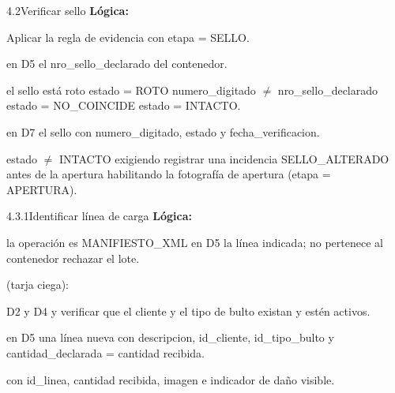 \begin{minispec}{4.2}{Verificar sello}
\textbf{Lógica:}
\begin{logica}
    \item Aplicar la regla de evidencia con etapa = SELLO.
    \item {} en D5 el nro\_sello\_declarado del contenedor.
    \item {} el sello está roto  estado = ROTO  numero\_digitado
    $\neq$ nro\_sello\_declarado  estado = NO\_COINCIDE  estado =
    INTACTO.
    \item {} en D7 el sello con numero\_digitado, estado y fecha\_verificacion.
    \item {} estado $\neq$ INTACTO  
    exigiendo registrar una incidencia SELLO\_ALTERADO antes de la apertura 
     habilitando la fotografía de apertura (etapa = APERTURA).
\end{logica}
\end{minispec}

\begin{minispec}{4.3.1}{Identificar línea de carga}
\textbf{Lógica:}
\begin{logica}
    \item {} la operación es MANIFIESTO\_XML  en D5 la línea indicada;
     no pertenece al contenedor  rechazar el lote.
    \item {} (tarja ciega):
    \begin{logica}
        \item {} D2 y D4 y verificar que el cliente y el tipo de bulto existan y estén
        activos.
        \item {} en D5 una línea nueva con descripcion, id\_cliente,
        id\_tipo\_bulto y cantidad\_declarada = cantidad recibida.
    \end{logica}
    \item {}  con id\_linea, cantidad recibida, imagen e
    indicador de daño visible.
\end{logica}
\end{minispec}

